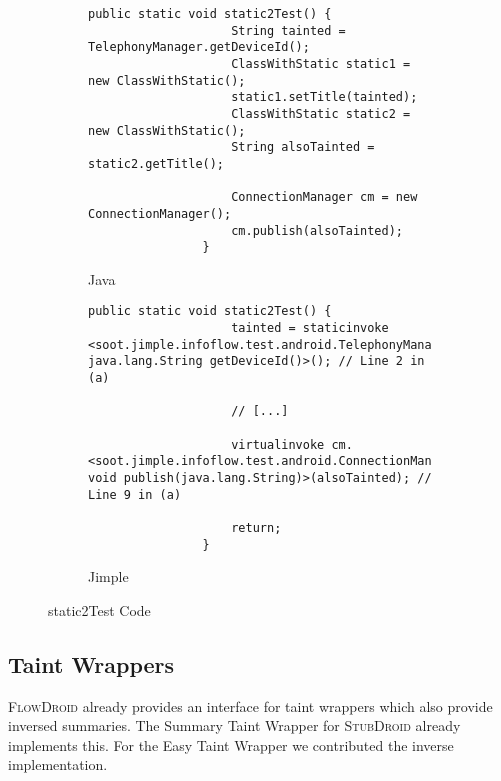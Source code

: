 \documentclass[../draft.tex]{subfiles}
\begin{document}
    \begin{figure}[ht]
        \centering
        \begin{subfigure}[b]{\textwidth}
            \begin{lstlisting}[gobble=12]
                public static void static2Test() {
                    String tainted = TelephonyManager.getDeviceId();
                    ClassWithStatic static1 = new ClassWithStatic();
                    static1.setTitle(tainted);
                    ClassWithStatic static2 = new ClassWithStatic();
                    String alsoTainted = static2.getTitle();
                    
                    ConnectionManager cm = new ConnectionManager();
                    cm.publish(alsoTainted);
                }
            \end{lstlisting}
            \caption{Java}
        \end{subfigure}
        \qquad
        \begin{subfigure}[b]{\textwidth}
            \begin{lstlisting}[language=Jimple]
                public static void static2Test() {
                    tainted = staticinvoke <soot.jimple.infoflow.test.android.TelephonyManager: java.lang.String getDeviceId()>(); // Line 2 in (a)

                    // [...]
            
                    virtualinvoke cm.<soot.jimple.infoflow.test.android.ConnectionManager: void publish(java.lang.String)>(alsoTainted); // Line 9 in (a)

                    return;
                }
            \end{lstlisting}
            \caption{Jimple}
        \end{subfigure}
        \caption{static2Test Code}
        \label{lst:static2TestJava}
    \end{figure}

    \subsection{Taint Wrappers}
    \textsc{FlowDroid} already provides an interface  for taint wrappers which also provide inversed summaries. The Summary Taint Wrapper for \textsc{StubDroid} already implements this. For the Easy Taint Wrapper we contributed the inverse implementation.
    
\end{document}
